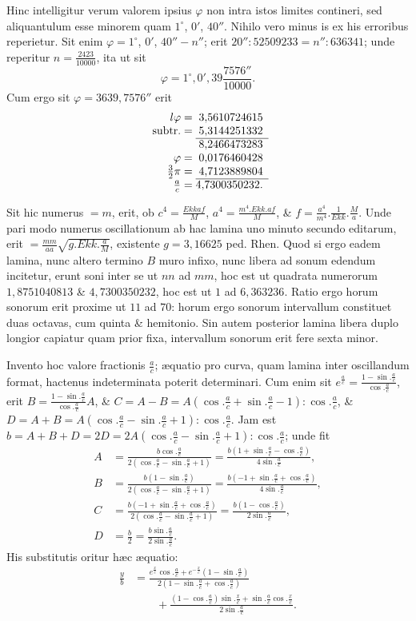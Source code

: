 Hinc intelligitur verum valorem ipsius $\varphi$ non intra istos limites contineri, sed aliquantulum esse minorem quam $1^\circ$, $0'$, $40''$. Nihilo vero minus is ex his erroribus reperietur. Sit enim $\varphi=1^\circ$, $0'$, $40''-n''$; erit $20'':52509233=n'':636341$; unde reperitur $n=\frac{2423}{10000}$, ita ut sit
\[\varphi=1^\circ,0',39\frac{7576''}{10000}.\]
Cum ergo sit $\varphi=3639{,}7576''$ erit
\[\begin{array}{r@{\;=\;}r}
l\varphi&3{,}5610724615\\
\text{subtr.}&5{,}3144251332\\\cline{2-2}
\multicolumn{1}{r}{}&8{,}2466473283\\
\varphi&0{,}0176460428\\
\frac32\pi&4{,}7123889804\\\cline{2-2}
\frac ac&4{,}7300350232.
\end{array}\]

Sit hic numerus $=m$, erit, ob $c^4=\frac{Ekkaf}M$, $a^4=\frac{m^4.Ekk.af}M$, \& $f=\frac{a^4}{m^4}.\frac1{Ekk}.\frac Ma$. Unde pari modo numerus oscillationum ab hac lamina uno minuto secundo editarum, erit $=\frac{mm}{aa}\sqrt{g.Ekk.\frac aM}$, existente $g=3{,}16625$ ped. Rhen. Quod si ergo eadem lamina, nunc altero termino $B$ muro infixo, nunc libera ad sonum edendum incitetur, erunt soni inter se ut $nn$ ad $mm$, hoc est ut quadrata numerorum $1{,}8751040813$ \& $4{,}7300350232$, hoc est ut $1$ ad $6{,}363236$. Ratio ergo horum sonorum erit proxime ut $11$ ad $70$: horum ergo sonorum intervallum constituet duas octavas, cum quinta \& hemitonio. Sin autem posterior lamina libera duplo longior capiatur quam prior fixa, intervallum sonorum erit fere sexta minor.

Invento hoc valore fractionis $\frac ac$; æquatio pro curva, quam lamina inter oscillandum format, hactenus indeterminata poterit determinari. Cum enim sit $e^{\frac ac}=\frac{1-\sin.\frac ac}{\cos.\frac ac}$, erit $B=\frac{1-\sin.\frac ac}{\cos.\frac ac}A$, \& $C=A-B=A(\cos.\frac ac+\sin.\frac ac-1):\cos.\frac ac$, \& $D=A+B=A(\cos.\frac ac-\sin.\frac ac+1):\cos.\frac ac$. Jam est $b=A+B+D=2D=2A(\cos.\frac ac-\sin.\frac ac+1):\cos.\frac ac$; unde fit
\[\begin{aligned}
A&=\frac{b\cos.\frac ac}{2(\cos.\frac ac-\sin.\frac ac+1)}=\frac{b(1+\sin.\frac ac-\cos.\frac ac)}{4\sin.\frac ac},\\
B&=\frac{b(1-\sin.\frac ac)}{2(\cos.\frac ac-\sin.\frac ac+1)}=\frac{b(-1+\sin.\frac ac+\cos.\frac ac)}{4\sin.\frac ac},\\
C&=\frac{b(-1+\sin.\frac ac+\cos.\frac ac)}{2(\cos.\frac ac-\sin.\frac ac+1)}=\frac{b(1-\cos.\frac ac)}{2\sin.\frac ac},\\
D&=\frac b2=\frac{b\sin.\frac ac}{2\sin.\frac ac}.
\end{aligned}\]
His substitutis oritur hæc æquatio:
\[\begin{aligned}
\frac yb&=\frac{e^{\frac xc}\cos.\frac ac+e^{-\frac xc}(1-\sin.\frac ac)}{2(1-\sin.\frac ac+\cos.\frac ac)}\\
&\qquad+\frac{(1-\cos.\frac ac)\sin.\frac xc+\sin.\frac ac\cos.\frac xc}{2\sin.\frac ac}.
\end{aligned}\]

